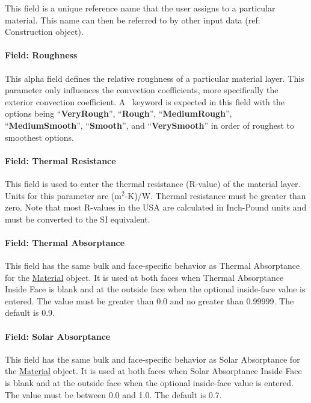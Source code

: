 This field is a unique reference name that the user assigns to a particular material. This name can then be referred to by other input data (ref: Construction object).

\paragraph{Field: Roughness}\label{field-roughness-1}

This alpha field defines the relative roughness of a particular material layer. This parameter only influences the convection coefficients, more specifically the exterior convection coefficient. A~ keyword is expected in this field with the options being ``\textbf{VeryRough}'', ``\textbf{Rough}'', ``\textbf{MediumRough}'', ``\textbf{MediumSmooth}'', ``\textbf{Smooth}'', and ``\textbf{VerySmooth}'' in order of roughest to smoothest options.

\paragraph{Field: Thermal Resistance}\label{field-thermal-resistance}

This field is used to enter the thermal resistance (R-value) of the material layer. Units for this parameter are (m\(^{2}\)-K)/W. Thermal resistance must be greater than zero. Note that most R-values in the USA are calculated in Inch-Pound units and must be converted to the SI equivalent.

\paragraph{Field: Thermal Absorptance}\label{field-thermal-absorptance-1}

This field has the same bulk and face-specific behavior as Thermal Absorptance for the \hyperref[material]{Material} object. It is used at both faces when Thermal Absorptance Inside Face is blank and at the outside face when the optional inside-face value is entered. The value must be greater than 0.0 and no greater than 0.99999. The default is 0.9.

\paragraph{Field: Solar Absorptance}\label{field-solar-absorptance-1}

This field has the same bulk and face-specific behavior as Solar Absorptance for the \hyperref[material]{Material} object. It is used at both faces when Solar Absorptance Inside Face is blank and at the outside face when the optional inside-face value is entered. The value must be between 0.0 and 1.0. The default is 0.7.

